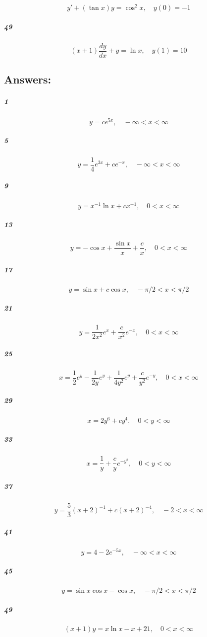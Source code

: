 \documentclass[fleqn]{article}
\begin{document}
\[
y' + (\tan x)y = \cos^2 x, \quad y(0) = -1
\]
\vfill


\pagebreak


\subparagraph{49}

\[
(x + 1) \frac{dy}{dx} + y = \ln x, \quad y(1) = 10
\]
\vfill


\pagebreak
\subsection*{Answers:}


\subparagraph{1}

\[
y = ce^{5x}, \quad -\infty < x < \infty
\]
\vfill



\subparagraph{5}

\[
y = \frac{1}{4}e^{3x} + ce^{-x}, \quad -\infty < x < \infty
\]
\vfill



\subparagraph{9}

\[
y = x^{-1}\ln x + cx^{-1}, \quad 0 < x < \infty
\]
\vfill



\subparagraph{13}

\[
y = -\cos x + \frac{\sin x}{x} + \frac{c}{x}, \quad 0 < x < \infty
\]
\vfill



\subparagraph{17}

\[
y = \sin x + c \cos x, \quad -\pi/2 < x < \pi/2
\]
\vfill



\subparagraph{21}

\[
y = \frac{1}{2x^2}e^x + \frac{c}{x^2}e^{-x}, \quad 0 < x < \infty
\]
\vfill



\subparagraph{25}

\[
x = \frac{1}{2}e^y - \frac{1}{2y}e^y + \frac{1}{4y^2}e^y + \frac{c}{y^2}e^{-y}, \quad 0 < x < \infty
\]
\vfill



\subparagraph{29}

\[
x = 2y^6 + cy^4, \quad 0 < y < \infty
\]
\vfill



\subparagraph{33}

\[
x = \frac{1}{y} + \frac{c}{y} e^{-y^2}, \quad 0 < y < \infty
\]
\vfill



\subparagraph{37}

\[
y = \frac{5}{3}(x + 2)^{-1} + c(x + 2)^{-4}, \quad -2 < x < \infty
\]
\vfill



\subparagraph{41}

\[
y = 4 - 2e^{-5x}, \quad -\infty < x < \infty
\]
\vfill



\subparagraph{45}

\[
y = \sin x \cos x - \cos x, \quad -\pi/2 < x < \pi/2
\]
\vfill



\subparagraph{49}

\[
(x + 1)y = x \ln x - x + 21, \quad 0 < x < \infty
\]
\vfill
\end{document}
